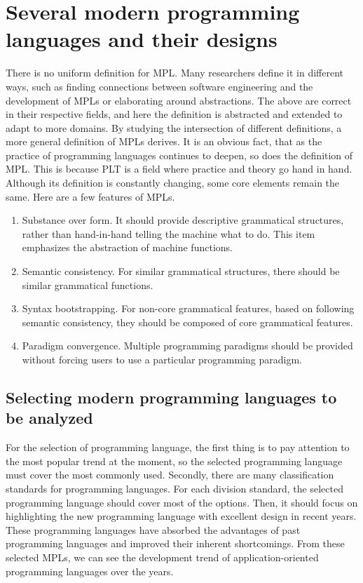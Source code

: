 \section{Several modern programming languages and their designs}

There is no uniform definition for MPL\@.
Many researchers define it in different ways, such as finding
connections between software engineering\cite{ModernProgrammingLanguagesSoftwareEnginerring}
and the development of MPLs or elaborating
around abstractions\cite{ModernProgrammingLanguagesAbstraction}.
The above are correct in their respective fields,
and here the definition is abstracted and extended to
adapt to more domains.
By studying the intersection of different definitions,
a more general definition of MPLs derives.
It is an obvious fact, that as the practice of
programming languages continues to deepen, so does
the definition of MPL. This is because PLT is a field
where practice and theory go hand in hand.
Although its definition is constantly changing, some
core elements remain the same.
Here are a few features of MPLs.

\begin{enumerate}
    \item Substance over form. It should provide descriptive grammatical structures, rather than hand-in-hand telling the machine what to do. This item emphasizes the abstraction of machine functions.
    \item Semantic consistency. For similar grammatical structures, there should be similar grammatical functions.
    \item Syntax bootstrapping. For non-core grammatical features, based on following semantic consistency, they should be composed of core grammatical features.
    \item Paradigm convergence. Multiple programming paradigms should be provided without forcing users to use a particular programming paradigm.
\end{enumerate}

\subsection{Selecting modern programming languages to be analyzed}

For the selection of programming language, the first thing is to pay attention to the most popular trend at the moment, so the selected programming language must cover the most commonly used. Secondly, there are many classification standards for programming languages. For each division standard, the selected programming language should cover most of the options. Then, it should focus on highlighting the new programming language with excellent design in recent years. These programming languages have absorbed the advantages of past programming languages and improved their inherent shortcomings. From these selected MPLs, we can see the development trend of application-oriented programming languages over the years.

